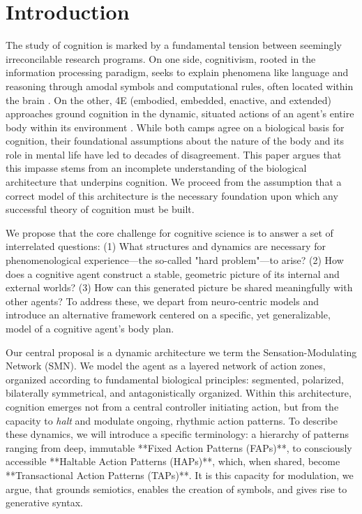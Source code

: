 \section{Introduction}
The study of cognition is marked by a fundamental tension between seemingly irreconcilable research programs. On one side, cognitivism, rooted in the information processing paradigm, seeks to explain phenomena like language and reasoning through amodal symbols and computational rules, often located within the brain \cite{chomsky1965aspects, fodor_modularity_1983}. On the other, 4E (embodied, embedded, enactive, and extended) approaches ground cognition in the dynamic, situated actions of an agent's entire body within its environment \cite{varela, noe_action_2004}. While both camps agree on a biological basis for cognition, their foundational assumptions about the nature of the body and its role in mental life have led to decades of disagreement. This paper argues that this impasse stems from an incomplete understanding of the biological architecture that underpins cognition. We proceed from the assumption that a correct model of this architecture is the necessary foundation upon which any successful theory of cognition must be built.

We propose that the core challenge for cognitive science is to answer a set of interrelated questions: (1) What structures and dynamics are necessary for phenomenological experience—the so-called "hard problem"—to arise? (2) How does a cognitive agent construct a stable, geometric picture of its internal and external worlds? (3) How can this generated picture be shared meaningfully with other agents? To address these, we depart from neuro-centric models and introduce an alternative framework centered on a specific, yet generalizable, model of a cognitive agent's body plan.

Our central proposal is a dynamic architecture we term the Sensation-Modulating Network (SMN). We model the agent as a layered network of action zones, organized according to fundamental biological principles: segmented, polarized, bilaterally symmetrical, and antagonistically organized. Within this architecture, cognition emerges not from a central controller initiating action, but from the capacity to \textit{halt} and modulate ongoing, rhythmic action patterns. To describe these dynamics, we will introduce a specific terminology: a hierarchy of patterns ranging from deep, immutable **Fixed Action Patterns (FAPs)**, to consciously accessible **Haltable Action Patterns (HAPs)**, which, when shared, become **Transactional Action Patterns (TAPs)**. It is this capacity for modulation, we argue, that grounds semiotics, enables the creation of symbols, and gives rise to generative syntax.

